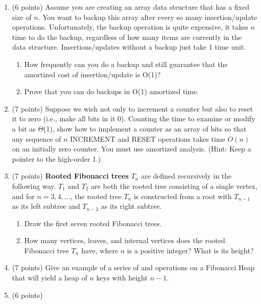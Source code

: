 \documentclass[6]{cs430homework}
\begin{document}
\maketitle
\begin{enumerate}[label=\arabic*.]
	\item (6 points) Assume you are creating an array data structure that has a fixed size of $n$. You want to backup this array after every so many insertion/update operations. Unfortunately, the backup operation is quite expensive, it takes $n$ time to do the backup, regardless of how many items are currently in the data structure. Insertions/updates without a backup just take 1 time unit.
	\begin{enumerate}[label=\arabic{enumi}\alph*)]
	    \item How frequently can you do a backup and still guarantee that the amortized cost of insertion/update is O(1)?
		\item Prove that you can do backups in O(1) amortized time.
	\end{enumerate}
	\item (7 points) Suppose we wish not only to increment a counter but also to reset it to zero (i.e., make all bits in it 0). Counting the time to examine or modify a bit as $\Theta$(1), show how to implement a counter as an array of bits so that any sequence of $n$ INCREMENT and RESET operations takes time $O(n)$ on an initially zero counter. You must use amortized analysis. (Hint: Keep a pointer to the high-order 1.)
	\item (7 points) \textbf{Rooted Fibonacci trees} $T_{n}$ are defined recursively in the following way. $T_{1}$ and $T_{2}$ are both the rooted tree consisting of a single vertex, and for $n=3,4,\dots$, the rooted tree $T_{n}$ is constructed from a root with $T_{n-1}$ as its left subtree and $T_{n-2}$ as its right subtree.
	\begin{enumerate}[label=\arabic{enumi}\alph*)]
	    \item Draw the first seven rooted Fibonacci trees.
		\item How many vertices, leaves, and internal vertices does the rooted Fibonacci tree $T_{n}$ have, where $n$ is a positive integer? What is its height?
	\end{enumerate}
	\item (7 points) Give an example of a series of  and  operations on a Fibonacci Heap that will yield a heap of $n$ keys with height $n-1$.
	\item (6 points)

\end{enumerate}
\end{document}
